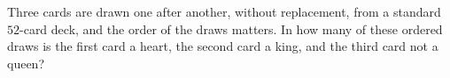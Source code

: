 Three cards are drawn one after another, without replacement, from a standard $52$-card deck, and the order of the draws matters. In how many of these ordered draws is the first card a heart, the second card a king, and the third card not a queen?
